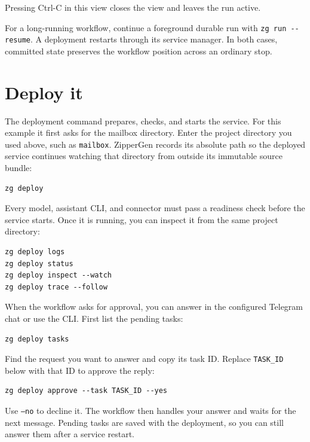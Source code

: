 \documentclass[11pt,a4paper]{article}
\begin{document}
Pressing Ctrl-C in this view closes the view and leaves the run active.

For a long-running workflow, continue a foreground durable run with
\texttt{zg run -{}-resume}. A deployment restarts through its service manager.
In both cases, committed state preserves the workflow position across an
ordinary stop.

\section{Deploy it}

The deployment command prepares, checks, and starts the service. For
this example it first asks for the mailbox directory. Enter the project
directory you used above, such as \texttt{mailbox}. ZipperGen records its
absolute path so the deployed service continues watching that directory from
outside its immutable source bundle:

\begin{lstlisting}[style=shell]
zg deploy
\end{lstlisting}

Every model, assistant CLI, and connector must pass a readiness check before
the service starts. Once it is running, you can inspect it from the same
project directory:

\begin{lstlisting}[style=shell]
zg deploy logs
zg deploy status
zg deploy inspect --watch
zg deploy trace --follow
\end{lstlisting}

When the workflow asks for approval, you can answer in the configured Telegram
chat or use the CLI. First list the pending tasks:

\begin{lstlisting}[style=shell]
zg deploy tasks
\end{lstlisting}

Find the request you want to answer and copy its task ID. Replace
\texttt{TASK\_ID} below with that ID to approve the reply:

\begin{lstlisting}[style=shell]
zg deploy approve --task TASK_ID --yes
\end{lstlisting}

Use \texttt{--no} to decline it. The workflow then handles your answer and
waits for the next message. Pending tasks are saved with the deployment, so
you can still answer them after a service restart.
\end{document}
